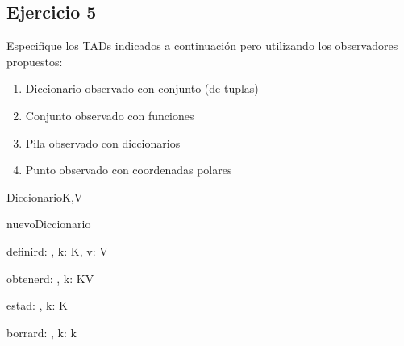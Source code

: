 \subsection{Ejercicio 5}

Especifique los TADs indicados a continuación pero utilizando los observadores propuestos:

\begin{enumerate}[label=\alph*)]
	\item Diccionario observado con conjunto (de tuplas)
	\item Conjunto observado con funciones
	\item Pila observado con diccionarios
	\item Punto observado con coordenadas polares
\end{enumerate}

\begin{tad}{Diccionario}{K,V}

	\begin{proc}{nuevoDiccionario}{}{\tadtype}
	\end{proc}

	\begin{proc}{definir}{\Inout d: \tadtype, \In k: K, \In v: V}{}
	\end{proc}

	\begin{proc}{obtener}{\In d: \tadtype, \In k: K}{V}
	\end{proc}

	\begin{proc}{esta}{\In d: \tadtype, \In k: K}{\bool}
	\end{proc}

	\begin{proc}{borrar}{\Inout d: \tadtype, \In k: k}{}
	\end{proc}

\end{tad}

